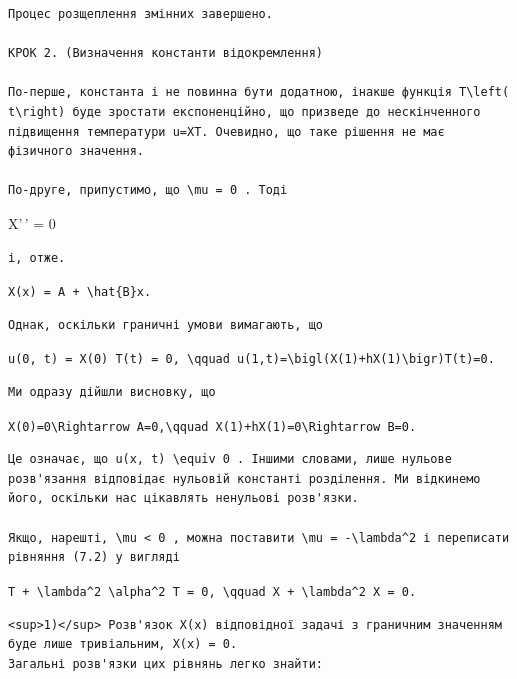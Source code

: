 \documentclass[
  ukrainian,
]{article}
\begin{document}
\begin{verbatim}
Процес розщеплення змінних завершено.

КРОК 2. (Визначення константи відокремлення)

По-перше, константа і не повинна бути додатною, інакше функція T\left( t\right) буде зростати експоненційно, що призведе до нескінченного підвищення температури u=XT. Очевидно, що таке рішення не має фізичного значення.

По-друге, припустимо, що \mu = 0 . Тоді
\end{verbatim}

X'\,' = 0

\begin{verbatim}
і, отже.
\end{verbatim}

\texttt{X(x)\ =\ A\ +\ \textbackslash{}hat\{B\}x.}

\begin{verbatim}
Однак, оскільки граничні умови вимагають, що
\end{verbatim}

\texttt{u(0,\ t)\ =\ X(0)\ T(t)\ =\ 0,\ \textbackslash{}qquad\ u(1,t)=\textbackslash{}bigl(X\textquotesingle{}(1)+hX(1)\textbackslash{}bigr)T(t)=0.}

\begin{verbatim}
Ми одразу дійшли висновку, що
\end{verbatim}

\texttt{X(0)=0\textbackslash{}Rightarrow\ A=0,\textbackslash{}qquad\ X\textquotesingle{}(1)+hX(1)=0\textbackslash{}Rightarrow\ B=0.}

\begin{verbatim}
Це означає, що u(x, t) \equiv 0 . Іншими словами, лише нульове розв'язання відповідає нульовій константі розділення. Ми відкинемо його, оскільки нас цікавлять ненульові розв'язки.

Якщо, нарешті, \mu < 0 , можна поставити \mu = -\lambda^2 і переписати рівняння (7.2) у вигляді
\end{verbatim}

\texttt{T\textquotesingle{}\ +\ \textbackslash{}lambda\^{}2\ \textbackslash{}alpha\^{}2\ T\ =\ 0,\ \textbackslash{}qquad\ X\textquotesingle{}\textquotesingle{}\ +\ \textbackslash{}lambda\^{}2\ X\ =\ 0.}

\begin{verbatim}
<sup>1)</sup> Розв'язок X(x) відповідної задачі з граничним значенням буде лише тривіальним, X(x) = 0. 
Загальні розв'язки цих рівнянь легко знайти:
\end{verbatim}
\end{document}
